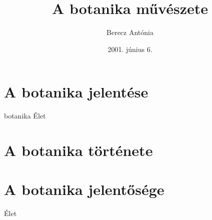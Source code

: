 \documentclass{book}
\title{A botanika művészete}
\author{Berecz Antónia}
\date{2001. június 6.}
\begin{document}
\frontmatter
\maketitle
\tableofcontents
\mainmatter
\chapter{A botanika jelentése}
\hulipsum
\index botanika
\index Élet
\chapter{A botanika története}
\hulipsum
\chapter{A botanika jelentősége}
\hulipsum
\index Élet
\backmatter
\printindex


\end{document}
